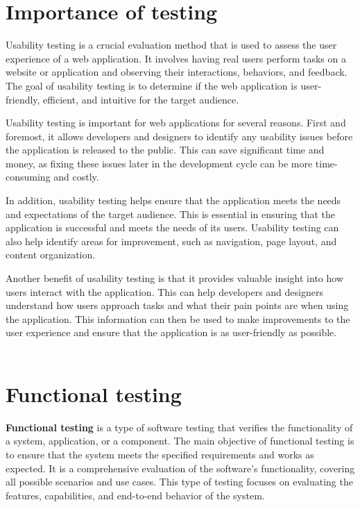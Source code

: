 \section{Importance of testing}
Usability testing is a crucial evaluation method that is used to assess the user 
experience of a web application. It involves having real users perform tasks on a 
website or application and observing their interactions, behaviors, and feedback. 
The goal of usability testing is to determine if the web application is user-friendly, 
efficient, and intuitive for the target audience.

Usability testing is important for web applications for several reasons. First and 
foremost, it allows developers and designers to identify any usability issues before 
the application is released to the public. This can save significant time and money, 
as fixing these issues later in the development cycle can be more time-consuming and costly.

In addition, usability testing helps ensure that the application meets the needs 
and expectations of the target audience. This is essential in ensuring that the 
application is successful and meets the needs of its users. Usability testing 
can also help identify areas for improvement, such as navigation, page layout, 
and content organization.

Another benefit of usability testing is that it provides valuable insight 
into how users interact with the application. This can help developers 
and designers understand how users approach tasks and what their pain 
points are when using the application. This information can then be 
used to make improvements to the user experience and ensure that 
the application is as user-friendly as possible.
\\
\\
\section{Functional testing}
\textbf{Functional testing} is a type of software testing that verifies the functionality of a system, application, or a component. 
The main objective of functional testing is to ensure that the system meets the specified requirements and works as expected. 
It is a comprehensive evaluation of the software's functionality, covering all possible scenarios and use cases. 
This type of testing focuses on evaluating the features, capabilities, and end-to-end behavior of the system.


